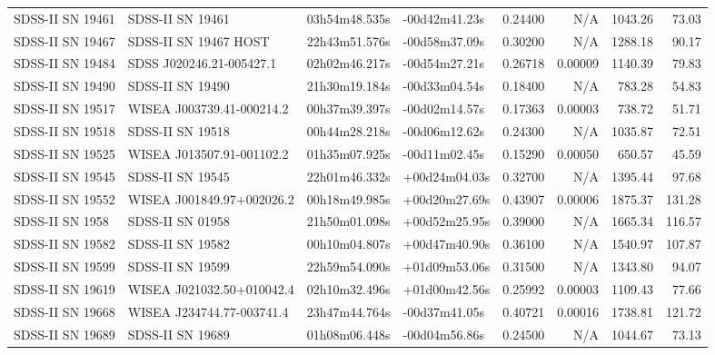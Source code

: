 \begin{longtable}{llllrrrr}
SDSS-II SN 19461 &                SDSS-II SN 19461 &   03h54m48.535s &   -00d42m41.23s &  0.24400 &      N/A &  1043.26 &       73.03 \\
SDSS-II SN 19467 &           SDSS-II SN 19467 HOST &   22h43m51.576s &   -00d58m37.09s &  0.30200 &      N/A &  1288.18 &       90.17 \\
SDSS-II SN 19484 &        SDSS J020246.21-005427.1 &   02h02m46.217s &   -00d54m27.21s &  0.26718 &  0.00009 &  1140.39 &       79.83 \\
SDSS-II SN 19490 &                SDSS-II SN 19490 &   21h30m19.184s &   -00d33m04.54s &  0.18400 &      N/A &   783.28 &       54.83 \\
SDSS-II SN 19517 &       WISEA J003739.41-000214.2 &   00h37m39.397s &   -00d02m14.57s &  0.17363 &  0.00003 &   738.72 &       51.71 \\
SDSS-II SN 19518 &                SDSS-II SN 19518 &   00h44m28.218s &   -00d06m12.62s &  0.24300 &      N/A &  1035.87 &       72.51 \\
SDSS-II SN 19525 &       WISEA J013507.91-001102.2 &   01h35m07.925s &   -00d11m02.45s &  0.15290 &  0.00050 &   650.57 &       45.59 \\
SDSS-II SN 19545 &                SDSS-II SN 19545 &   22h01m46.332s &   +00d24m04.03s &  0.32700 &      N/A &  1395.44 &       97.68 \\
SDSS-II SN 19552 &       WISEA J001849.97+002026.2 &   00h18m49.985s &   +00d20m27.69s &  0.43907 &  0.00006 &  1875.37 &      131.28 \\
SDSS-II SN 1958  &                SDSS-II SN 01958 &   21h50m01.098s &   +00d52m25.95s &  0.39000 &      N/A &  1665.34 &      116.57 \\
SDSS-II SN 19582 &                SDSS-II SN 19582 &   00h10m04.807s &   +00d47m40.90s &  0.36100 &      N/A &  1540.97 &      107.87 \\
SDSS-II SN 19599 &                SDSS-II SN 19599 &   22h59m54.090s &   +01d09m53.06s &  0.31500 &      N/A &  1343.80 &       94.07 \\
SDSS-II SN 19619 &       WISEA J021032.50+010042.4 &   02h10m32.496s &   +01d00m42.56s &  0.25992 &  0.00003 &  1109.43 &       77.66 \\
SDSS-II SN 19668 &       WISEA J234744.77-003741.4 &   23h47m44.764s &   -00d37m41.05s &  0.40721 &  0.00016 &  1738.81 &      121.72 \\
SDSS-II SN 19689 &                SDSS-II SN 19689 &   01h08m06.448s &   -00d04m56.86s &  0.24500 &      N/A &  1044.67 &       73.13 \\

\end{longtable}
